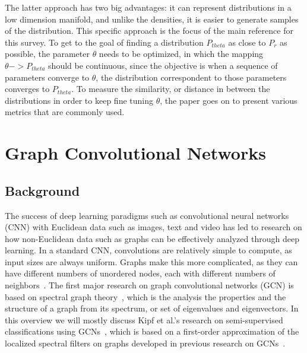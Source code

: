 \documentclass{article}
\begin{document}
The latter approach has two big advantages: it can represent distributions in a low dimension manifold, and unlike the densities, it is easier to generate samples of the distribution. This specific approach is the focus of the main reference for this survey. To get to the goal of finding a distribution  $P_{theta}$ as close to $P_{r}$ as possible, the parameter $\theta$ needs to be optimized, in which the mapping $\theta -> P_{theta}$ should be continuous, since the objective is when a sequence of parameters converge to $\theta$, the distribution correspondent to those parameters converges to $P_{theta}$. To measure the similarity, or distance in between the distributions in order to keep fine tuning $\theta$, the paper goes on to present various metrics that are commonly used. 



\section{Graph Convolutional Networks}
\subsection{Background}
The success of deep learning paradigms such as convolutional neural networks (CNN) with Euclidean data such as images, text and video has led to research on how non-Euclidean data such as graphs can be effectively analyzed through deep learning. In a standard CNN, convolutions are relatively simple to compute, as input sizes are always uniform. Graphs make this more complicated, as they can have different numbers of unordered nodes, each with different numbers of neighbors~\cite{Wu2019}. The first major research on graph convolutional networks (GCN) is based on spectral graph theory~\cite{Bruna2013}, which is the analysis the properties and the structure of a graph from its spectrum, or set of eigenvalues and eigenvectors. In this overview we will mostly discuss Kipf et al.'s research on semi-supervised classifications using GCNs~\cite{Kipf2016}, which is based on a first-order approximation of the localized spectral filters on graphs developed in previous research on GCNs~\cite{Bruna2013}. 
\end{document}
